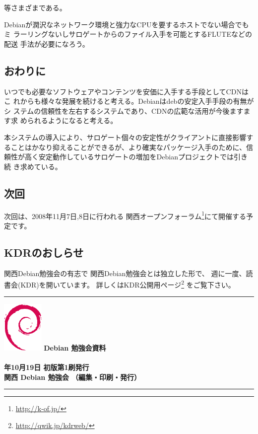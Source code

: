 \documentclass[mingoth,a4paper]{jsarticle}
\newcommand{\debmtgyear}{2008}
\newcommand{\debmtgdate}{19}
\newcommand{\debmtgmonth}{10}
\begin{document}
等さまざまである。

Debianが潤沢なネットワーク環境と強力なCPUを要するホストでない場合でもミ
ラーリングないしサロゲートからのファイル入手を可能とするFLUTEなどの配送
手法が必要になろう。

\newpage 

\subsection{おわりに}

いつでも必要なソフトウェアやコンテンツを安価に入手する手段としてCDNはこ
れからも様々な発展を続けると考える。Debianはdebの安定入手手段の有無がシ
ステムの信頼性を左右するシステムであり、CDNの広範な活用が今後ますます求
められるようになると考える。

本システムの導入により、サロゲート個々の安定性がクライアントに直接影響す
ることはかなり抑えることができるが、より確実なパッケージ入手のために、信
頼性が高く安定動作しているサロゲートの増加をDebianプロジェクトでは引き続
き求めている。


\subsection{次回}
次回は、2008年11月7日,8日に行われる
関西オープンフォーラム\footnote{\url{http://k-of.jp/}}にて開催する予定です。

\subsection{KDRのおしらせ}
関西Debian勉強会の有志で
関西Debian勉強会とは独立した形で、
週に一度、読書会(KDR)を開いています。
詳しくはKDR公開用ページ\footnote{\url{http://qwik.jp/kdrweb/}}
をご覧下さい。

\mbox{}\newpage

\printindex
 \cleartooddpage

 \begin{minipage}[b]{0.2\hsize}
 \end{minipage}
 \begin{minipage}[b]{0.8\hsize}

 \vspace*{15cm}
 \rule{\hsize}{1mm}
 \vspace{2mm}
 \includegraphics[width=2cm]{image200502/openlogo-nd.eps}
 \noindent \Large \bf Debian 勉強会資料\\ \\
 \noindent \normalfont \debmtgyear{}年\debmtgmonth{}月\debmtgdate{}日 \hspace{5mm}  初版第1刷発行\\
 \noindent \normalfont 関西 Debian 勉強会 （編集・印刷・発行）\\
 \rule{\hsize}{1mm}
 \end{minipage}
\end{document}
